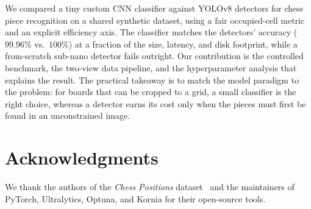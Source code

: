 \documentclass[10pt,twocolumn,a4paper]{article}
\begin{document}
	We compared a tiny custom CNN classifier against YOLOv8 detectors for chess piece recognition on a shared synthetic dataset, using a fair occupied-cell metric and an explicit efficiency axis. The classifier matches the detectors' accuracy ($99.96\%$ vs.\ $100\%$) at a fraction of the size, latency, and disk footprint, while a from-scratch sub-nano detector fails outright. Our contribution is the controlled benchmark, the two-view data pipeline, and the hyperparameter analysis that explains the result. The practical takeaway is to match the model paradigm to the problem: for boards that can be cropped to a grid, a small classifier is the right choice, whereas a detector earns its cost only when the pieces must first be found in an unconstrained image.

	\section*{Acknowledgments}

	We thank the authors of the \textit{Chess Positions} dataset~\cite{koryakin2019chess} and the maintainers of PyTorch, Ultralytics, Optuna, and Kornia for their open-source tools.

	
	
\end{document}
